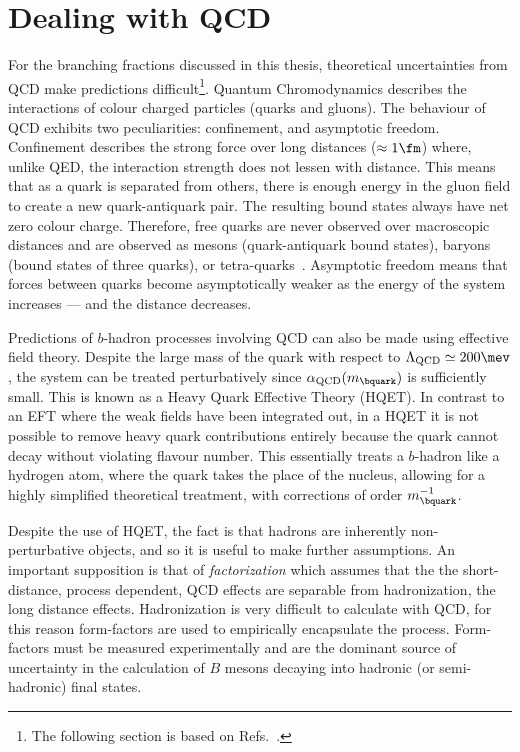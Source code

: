 \section{Dealing with QCD}

For the branching fractions discussed in this thesis, theoretical uncertainties from QCD make
predictions difficult\footnote{
  The following section is based on Refs.~\cite{Pich:1998xt}.
}.
Quantum Chromodynamics describes the interactions of colour charged particles (quarks and
gluons).
The behaviour of QCD exhibits two peculiarities: confinement, and asymptotic freedom.
Confinement describes the strong force over long distances ($\approx1\fm$)
where, unlike QED, the interaction strength does not lessen with distance.
This means that as a quark is separated from others, there is enough energy in the gluon field to
create a new quark-antiquark pair.
The resulting bound states always have net zero colour charge.
Therefore, free quarks are never observed over macroscopic distances
and are observed as mesons (quark-antiquark bound states), baryons (bound states of
three quarks), or tetra-quarks~\cite{LHCb-PAPER-2014-014}.
Asymptotic freedom means that forces between quarks become asymptotically weaker as the energy of
the system increases --- and the distance decreases.

Predictions of $b$-hadron processes involving QCD can also be made using effective field theory.
Despite the large mass of the \bquark quark with respect to $\Lambda_\mathrm{QCD}\simeq200\mev$,
the system can be treated perturbatively since $\alpha_\mathrm{QCD}(m_\bquark)$ is sufficiently
small.
This is known as a Heavy Quark Effective Theory (HQET).
In contrast to an EFT where the weak fields have been integrated out, in a HQET
it is not possible to remove heavy quark contributions entirely because the \bquark quark
cannot decay without violating flavour number.
This essentially treats a $b$-hadron like a hydrogen atom, where the \bquark quark takes
the place of the nucleus, allowing for a highly simplified theoretical treatment, with corrections
of order $m_\bquark^{-1}$.

Despite the use of HQET, the fact is that hadrons are inherently non-perturbative objects, and so
it is useful to make further assumptions.
An important supposition is that of \emph{factorization} which assumes that the the short-distance,
process dependent, QCD effects are separable from hadronization, the long distance effects.
Hadronization is very difficult to calculate with QCD, for this reason form-factors are used to
empirically encapsulate the process.
Form-factors must be measured experimentally and are the dominant source of uncertainty in the
calculation of $B$ mesons decaying into hadronic (or semi-hadronic) final states.





